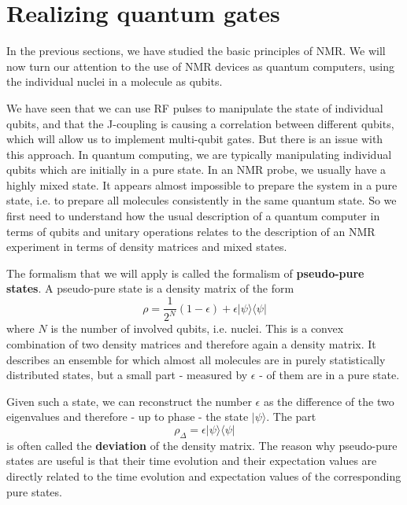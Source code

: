 \documentclass[a4paper, draft]{article}
\theoremstyle{own}
\theoremstyle{remark}
\begin{document}
\section{Realizing quantum gates}


In the previous sections, we have studied the basic principles of NMR. We will now turn our attention to the use of NMR devices as quantum computers, using the individual nuclei in a molecule as qubits. 

We have seen that we can use RF pulses to manipulate the state of individual qubits, and that the J-coupling is causing a correlation between different qubits, which will allow us to implement multi-qubit gates. But there is an issue with this approach. In quantum computing, we are typically manipulating individual qubits which are initially in a pure state. In an NMR probe, we usually have a highly mixed state. It appears almost impossible to prepare the system in a pure state, i.e. to prepare all molecules consistently in the same quantum state. So we first need to understand how the usual description of a quantum computer in terms of qubits and unitary operations relates to the description of an NMR experiment in terms of density matrices and mixed states.

The formalism that we will apply is called the formalism of {\bf pseudo-pure states}. A pseudo-pure state is a density matrix of the form
$$
\rho = \frac{1}{2^N} (1-\epsilon) + \epsilon |\psi \rangle \langle \psi | 
$$
where $N$ is the number of involved qubits, i.e. nuclei. This is a convex combination of two density matrices and therefore again a density matrix. It describes an ensemble for which almost all molecules are in purely statistically distributed states, but a small part - measured by $\epsilon$ - of them are in a pure state. 

Given such a state, we can reconstruct the number $\epsilon$ as the difference of the two eigenvalues and therefore - up to phase - the state $|\psi \rangle$. The part 
$$
\rho_{\Delta} = \epsilon |\psi \rangle \langle \psi | 
$$
is often called the {\bf deviation} of the density matrix. The reason why pseudo-pure states are useful is that their time evolution and their expectation values are directly related to the time evolution and expectation values of the corresponding pure states.
\end{document}
